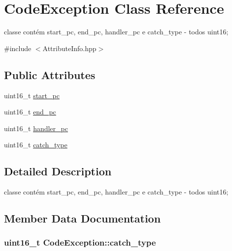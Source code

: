 \hypertarget{class_code_exception}{}\section{Code\+Exception Class Reference}
\label{class_code_exception}


classe contém start\+\_\+pc, end\+\_\+pc, handler\+\_\+pc e catch\+\_\+type -\/ todos uint16;  




{\ttfamily \#include $<$Attribute\+Info.\+hpp$>$}

\subsection*{Public Attributes}
\begin{DoxyCompactItemize}
\item 
uint16\+\_\+t \hyperlink{class_code_exception_a18754b054d8331acbad758612698e599}{start\+\_\+pc}
\item 
uint16\+\_\+t \hyperlink{class_code_exception_a357306bca81fcf2e7bc9dfcedc9c4f96}{end\+\_\+pc}
\item 
uint16\+\_\+t \hyperlink{class_code_exception_a8c66a2462bd2668d7824e7f3745385d6}{handler\+\_\+pc}
\item 
uint16\+\_\+t \hyperlink{class_code_exception_a0b2110e6c93d442c66cf10563920537c}{catch\+\_\+type}
\end{DoxyCompactItemize}


\subsection{Detailed Description}
classe contém start\+\_\+pc, end\+\_\+pc, handler\+\_\+pc e catch\+\_\+type -\/ todos uint16; 

\subsection{Member Data Documentation}
\subsubsection[{\texorpdfstring{catch\+\_\+type}{catch_type}}]{\setlength{\rightskip}{0pt plus 5cm}uint16\+\_\+t Code\+Exception\+::catch\+\_\+type}\hypertarget{class_code_exception_a0b2110e6c93d442c66cf10563920537c}{}\label{class_code_exception_a0b2110e6c93d442c66cf10563920537c}
